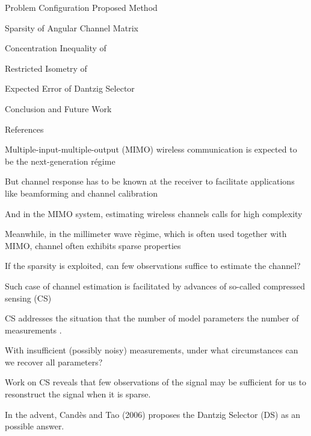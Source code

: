 

\blank [big]

\blank [big]

\page [yes] %
{
\I Problem Configuration Proposed Method

\I Sparsity of Angular Channel Matrix

\I Concentration Inequality of 

\I Restricted Isometry of 

\I Expected Error of Dantzig Selector

\I Conclusion and Future Work

\I References
}
\page [yes] %
{
\I Multiple-input-multiple-output (MIMO) wireless communication is expected to be the next-generation r\'egime

\I But channel response has to be known at the receiver to facilitate applications like beamforming and channel calibration

\I And in the MIMO system, estimating wireless channels calls for high complexity

\I Meanwhile, in the millimeter wave r\`egime, which is often used together with MIMO, channel often exhibits sparse properties

\I If the sparsity is exploited, can few observations suffice to estimate the channel?
}
\page [yes] %
{
\I Such case of channel estimation is facilitated by advances of so-called compressed sensing (CS)

\I CS addresses the situation that the number of model parameters  the number of measurements .

\I With insufficient (possibly noisy) measurements, under what circumstances can we recover all  parameters?

\I Work on CS reveals that few observations of the signal may be sufficient for us to resonstruct the signal when it is sparse.

\I In the advent, Cand\`es and Tao (2006) proposes the Dantzig Selector (DS) as an possible answer.
}
\page [yes] %

